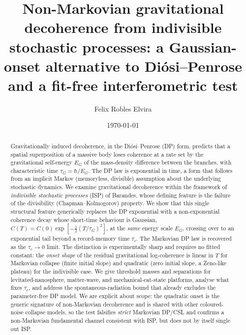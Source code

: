 \documentclass[aps,pra,preprint,amsmath,amssymb,nofootinbib,superscriptaddress]{revtex4-2}
\begin{document}
\title{Non-Markovian gravitational decoherence from indivisible stochastic
processes: a Gaussian-onset alternative to Di\'osi--Penrose and a fit-free
interferometric test}

\author{Felix Robles Elvira}

\date{\today}

\begin{abstract}
Gravitationally induced decoherence, in the Di\'osi--Penrose (DP) form, predicts
that a spatial superposition of a massive body loses coherence at a rate set by
the gravitational self-energy $E_G$ of the mass-density difference between the
branches, with characteristic time $\tau_G=\hbar/E_G$. The DP law is exponential
in time, a form that follows from an implicit Markov (memoryless, divisible)
assumption about the underlying stochastic dynamics. We examine gravitational
decoherence within the framework of \emph{indivisible stochastic processes}
(ISP) of Barandes, whose defining feature is the failure of the divisibility
(Chapman--Kolmogorov) property. We show that this single structural feature
generically replaces the DP exponential with a non-exponential coherence decay
whose short-time behaviour is Gaussian, $C(T)=C(0)\exp[-\tfrac12(T/\tau_G)^2]$,
at the \emph{same} energy scale $E_G$, crossing over to an exponential tail
beyond a record-memory time $\tau_c$. The Markovian DP law is recovered as the
$\tau_c\to0$ limit. The distinction is experimentally sharp and requires no
fitted constant: the \emph{onset shape} of the residual gravitational
log-coherence is linear in $T$ for Markovian collapse (finite initial slope) and
quadratic (zero initial slope, a Zeno-like plateau) for the indivisible case. We
give threshold masses and separations for levitated-nanosphere, matter-wave, and
mechanical-cat-state platforms, analyse what fixes $\tau_c$, and address the
spontaneous-radiation bound that already excludes the parameter-free DP model. We
are explicit about scope: the quadratic onset is the generic signature of
non-Markovian decoherence and is shared with other coloured-noise collapse
models, so the test falsifies \emph{strict} Markovian DP/CSL and confirms a
non-Markovian fundamental channel consistent with ISP, but does not by itself
single out ISP.
\end{abstract}

\maketitle
\end{document}
